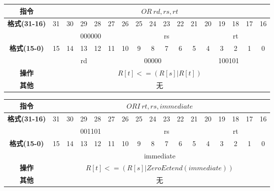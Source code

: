 \documentclass[11pt,utf8]{article}
\begin{document}
\begin{center}
\begin{tabular}{|c|c|c|c|c|c|c|c|c|c|c|c|c|c|c|c|c|}
\hline
\textbf{指令} & \multicolumn{16}{c|}{$OR~rd, rs, rt$} \\
\hline
\multirow{2}{*}{\textbf{格式(31-16)}} & 31 & 30 & 29 & 28 & 27 & 26 & 25 & 24 & 23 & 22 & 21 & 20 & 19 & 18 & 17 & 16 \\ 
\cline{2-17}
& \multicolumn{6}{c|}{000000} & \multicolumn{5}{c|}{rs} & \multicolumn{5}{c|}{rt}\\
\hline
\multirow{2}{*}{\textbf{格式(15-0)}} & 15 & 14 & 13 & 12 & 11 & 10 & 9 & 8 & 7 & 6 & 5 & 4 & 3 & 2 & 1 & 0 \\
\cline{2-17}
& \multicolumn{5}{c|}{rd} & \multicolumn{5}{c|}{00000} & \multicolumn{6}{c|}{100101}\\
\hline
\textbf{操作} & \multicolumn{16}{c|}{$R[t]<=(R[s] | R[t])$} \\
\hline
\textbf{其他} & \multicolumn{16}{c|}{无} \\
\hline
\end{tabular}
\end{center}

\begin{center}
\begin{tabular}{|c|c|c|c|c|c|c|c|c|c|c|c|c|c|c|c|c|}
\hline
\textbf{指令} & \multicolumn{16}{c|}{$ORI~rt,rs,immediate$} \\
\hline
\multirow{2}{*}{\textbf{格式(31-16)}} & 31 & 30 & 29 & 28 & 27 & 26 & 25 & 24 & 23 & 22 & 21 & 20 & 19 & 18 & 17 & 16 \\ 
\cline{2-17}
& \multicolumn{6}{c|}{001101} & \multicolumn{5}{c|}{rs} & \multicolumn{5}{c|}{rt}\\
\hline
\multirow{2}{*}{\textbf{格式(15-0)}} & 15 & 14 & 13 & 12 & 11 & 10 & 9 & 8 & 7 & 6 & 5 & 4 & 3 & 2 & 1 & 0 \\
\cline{2-17}
& \multicolumn{16}{c|}{immediate}\\
\hline
\textbf{操作} & \multicolumn{16}{c|}{$R[t]<=(R[s] | ZeroEctend(immediate))$} \\
\hline
\textbf{其他} & \multicolumn{16}{c|}{无} \\
\hline
\end{tabular}
\end{center}
\end{document}
